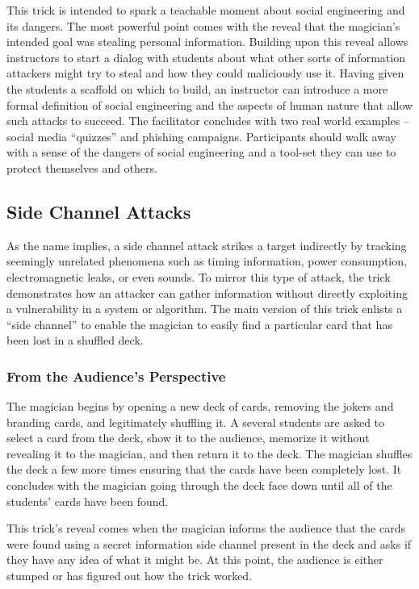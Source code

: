 This trick is intended to spark a teachable moment about
social engineering and
its dangers.
The most powerful point comes with the reveal that the magician's
intended goal was stealing personal information.
Building upon this reveal allows instructors to start a dialog with
students about what other
sorts of information attackers might try to steal and
how they could maliciously use it.
Having given the students a scaffold on which to build,
an instructor can
introduce a more formal definition of social engineering
and the aspects of human nature that allow such attacks to succeed.
The facilitator concludes with two real world examples --
social media ``quizzes'' and phishing campaigns.
Participants should walk away with a sense of the
dangers of social engineering and a tool-set they can use to protect
themselves and others.

\subsection{Side Channel Attacks}

As the name implies, a side channel attack strikes a target indirectly
by tracking seemingly unrelated phenomena
such as timing information, power consumption, electromagnetic leaks, or even
sounds.  To mirror this type of attack, the trick
demonstrates how an attacker can
gather information without directly exploiting
a vulnerability in a system or algorithm.
The main version of this trick enlists a ``side channel'' to
enable the magician to easily
find a particular card that has been lost in a shuffled deck.

\subsubsection{From the Audience's Perspective}

The magician begins by opening a new deck of cards, removing the jokers and
branding cards, and legitimately shuffling it.  A several students are
asked to
select a card from the deck, show it to the audience, memorize it without
revealing it to the magician, and then return it to the deck.
The magician shuffles the deck a few more times ensuring that the cards
have
been completely lost.
It concludes with the magician going through the deck face down
until all of the students' cards have been found.

This trick's reveal comes when the magician informs the audience
that the cards were found using a secret
information side channel present in the
deck and asks if they have any idea of what it might be.
At this point, the audience is either stumped or has figured out how the trick
worked.

